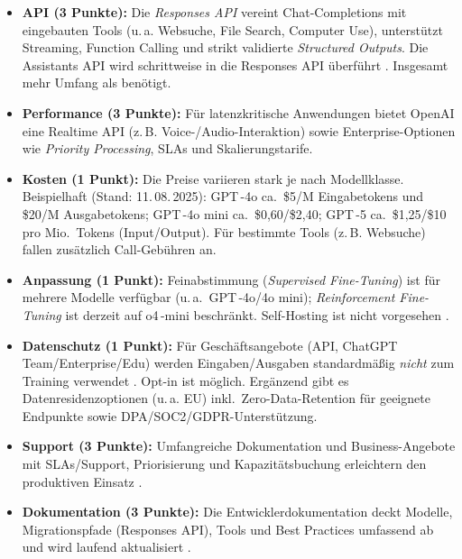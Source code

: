       \begin{itemize}
        \item \textbf{\acs{API} (3 Punkte):} Die \emph{Responses \acs{API}} vereint Chat-Completions mit eingebauten Tools (u.\,a. Websuche, File Search, Computer Use), unterstützt Streaming, Function Calling und strikt validierte \emph{Structured Outputs}.
        Die Assistants \acs{API} wird schrittweise in die Responses \acs{API} überführt \autocite{openai-docs}.
        Insgesamt mehr Umfang als benötigt.
        \item \textbf{Performance (3 Punkte):} Für latenzkritische Anwendungen bietet OpenAI eine Realtime \acs{API} (z.\,B. Voice-/Audio-Interaktion) sowie Enterprise-Optionen wie \emph{Priority Processing}, SLAs und Skalierungstarife.\autocite{openai-docs,openai-pricing-2025}
        \item \textbf{Kosten (1 Punkt):} Die Preise variieren stark je nach Modellklasse.
        Beispielhaft (Stand: 11.\,08.\,2025): GPT\,-4o ca.\ \$5/M Eingabetokens und \$20/M Ausgabetokens; GPT\,-4o mini ca.\ \$0{,}60/\$2{,}40; GPT\,-5 ca.\ \$1{,}25/\$10 pro Mio.\ Tokens (Input/Output).
        Für bestimmte Tools (z.\,B. Websuche) fallen zusätzlich Call-Gebühren an.\autocite{openai-pricing-2025}
        \item \textbf{Anpassung (1 Punkt):} Feinabstimmung (\emph{Supervised Fine-Tuning}) ist für mehrere Modelle verfügbar (u.\,a.\ GPT\,-4o/4o mini); \emph{Reinforcement Fine-Tuning} ist derzeit auf o4\,-mini beschränkt.
        Self-Hosting ist nicht vorgesehen \autocite{openai-docs}.
        \item \textbf{Datenschutz (1 Punkt):} Für Geschäftsangebote (\acs{API}, ChatGPT Team/Enterprise/Edu) werden Eingaben/Ausgaben standardmäßig \emph{nicht} zum Training verwendet \autocite{openai-docs}.
        Opt-in ist möglich.
        Ergänzend gibt es Datenresidenzoptionen (u.\,a. EU) inkl.\ Zero-Data-Retention für geeignete Endpunkte sowie DPA/SOC2/GDPR-Unterstützung.
        \item \textbf{Support (3 Punkte):} Umfangreiche Dokumentation und Business-Angebote mit SLAs/Support, Priorisierung und Kapazitätsbuchung erleichtern den produktiven Einsatz \autocite{openai-pricing-2025,openai-docs}.
        \item \textbf{Dokumentation (3 Punkte):} Die Entwicklerdokumentation deckt Modelle, Migrationspfade (Responses \acs{API}), Tools und Best Practices umfassend ab und wird laufend aktualisiert \autocite{openai-docs}.
      \end{itemize}

